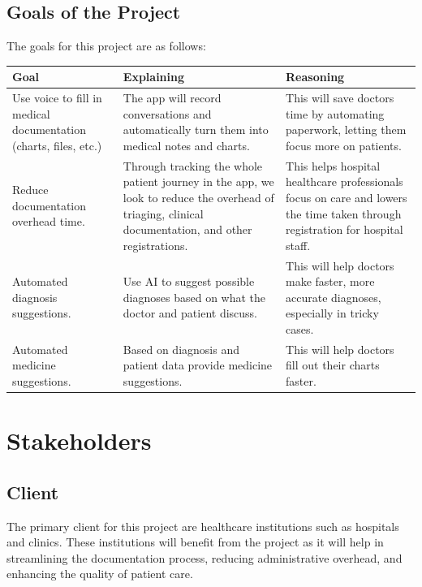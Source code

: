 \documentclass[12pt]{article}
\begin{document}
\subsection{Goals of the Project}

The goals for this project are as follows:

\begin{table}[H]
  \centering
  \begin{tabular}{p{4cm} p{4cm} p{4cm}}
      \toprule
      \textbf{Goal} & \textbf{Explaining} & \textbf{Reasoning} \\
      \midrule
      Use voice to fill in medical documentation (charts, files, etc.) & The app will record conversations and automatically turn them into medical notes and charts. & This will save doctors time by automating paperwork, letting them focus more on patients. \\
      \midrule
      Reduce documentation overhead time.  & Through tracking the whole patient journey in the app, we look to reduce the overhead of triaging, clinical documentation, and other registrations.  & This helps hospital healthcare professionals focus on care and lowers the time taken through registration for hospital staff. \\
      \midrule
      Automated diagnosis suggestions.  & Use AI to suggest possible diagnoses based on what the doctor and patient discuss.  & This will help doctors make faster, more accurate diagnoses, especially in tricky cases. \\
      \midrule
      Automated medicine suggestions. & Based on diagnosis and patient data provide medicine suggestions. & This will help doctors fill out their charts faster. \\
      \bottomrule
  \end{tabular}
\end{table}

\section{Stakeholders}

\subsection{Client}
The primary client for this project are healthcare institutions such as hospitals and clinics. These institutions will benefit from the project as it will help in streamlining the documentation process, reducing administrative overhead, and enhancing the quality of patient care.
\end{document}

